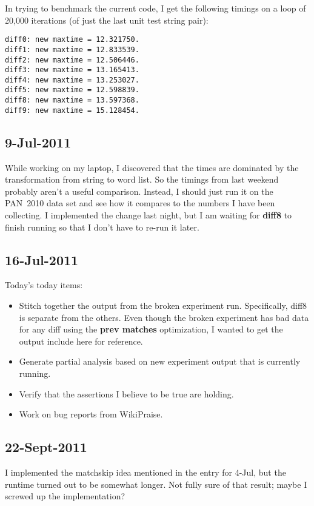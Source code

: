 In trying to benchmark the current code, I get
the following timings on a loop of 20,000 iterations
(of just the last unit test string pair):
\begin{verbatim}
diff0: new maxtime = 12.321750.
diff1: new maxtime = 12.833539.
diff2: new maxtime = 12.506446.
diff3: new maxtime = 13.165413.
diff4: new maxtime = 13.253027.
diff5: new maxtime = 12.598839.
diff8: new maxtime = 13.597368.
diff9: new maxtime = 15.128454.
\end{verbatim}

\subsection{9-Jul-2011}

While working on my laptop, I discovered that the times
are dominated by the transformation from string to word list.
So the timings from last weekend probably aren't a useful comparison.
Instead, I should just run it on the PAN~2010 data set and
see how it compares to the numbers I have been collecting.
I implemented the change last night, but I am waiting for
\textbf{diff8} to finish running so that I don't have to
re-run it later.

\subsection{16-Jul-2011}

Today's today items:
\begin{itemize}
\item Stitch together the output from the broken experiment run.
  Specifically, diff8 is separate from the others.
  Even though the broken experiment has bad data for any
  diff using the \textbf{prev matches} optimization, I wanted to
  get the output include here for reference.
\item Generate partial analysis based on new experiment output
  that is currently running.
\item Verify that the assertions I believe to be true are holding.
\item Work on bug reports from WikiPraise.
\end{itemize}

\subsection{22-Sept-2011}

I implemented the matchskip idea mentioned in the entry for 4-Jul,
but the runtime turned out to be somewhat longer.
Not fully sure of that result; maybe I screwed up the implementation?

